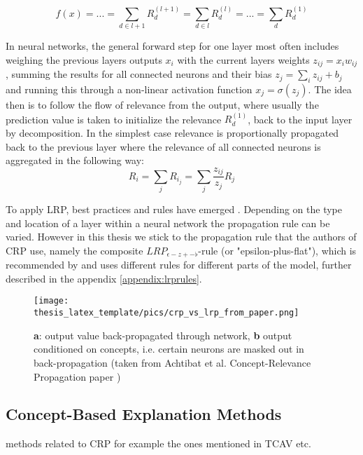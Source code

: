 \begin{equation}
    f(x) = ... = \sum_{d \in l+1} R^{(l+1)}_d =  \sum_{d \in l} R^{(l)}_d = ... =  \sum_{d} R^{(1)}_d
\end{equation}

In neural networks, the general forward step for one layer most often includes weighing the previous layers outputs $x_i$ with the current layers weights $z_{ij} = x_i w_{ij}$, summing the results for all connected neurons and their bias $z_{j} = \sum_{i} z_{ij} + b_j$ and running this through a non-linear activation function $x_j = \sigma (z_j)$.
The idea then is to follow the flow of relevance from the output, where usually the prediction value is taken to initialize the relevance $R^(1)_d$, back to the input layer by decomposition. In the simplest case relevance is proportionally propagated back to the previous layer where the relevance of all connected neurons is aggregated in the following way:
\begin{equation}
    R_i = \sum_{j}  R_{i_j} = \sum_{j} \frac{z_{ij}}{z_j} R_j
\end{equation}

To apply LRP, best practices and rules have emerged \cite{Kohlbrenner2020, Montavon2019, Samek2021}. Depending on the type and location of a layer within a neural network the propagation rule can be varied. However in this thesis we stick to the propagation rule that the authors of CRP use, namely the composite $LRP_{\epsilon-z+-\flat}$-rule (or "epsilon-plus-flat"), which is recommended by \cite{Kohlbrenner2020} and uses different rules for different parts of the model, further described in the appendix \autoref{appendix:lrprules}.

\begin{figure}
    \centering
    \texttt{[image: thesis\_latex\_template/pics/crp\_vs\_lrp\_from\_paper.png]}
    \caption[CRP vs. LRP]{\textbf{a}: output value back-propagated through network, \textbf{b} output conditioned on concepts, i.e. certain neurons are masked out in back-propagation (taken from Achtibat et al. Concept-Relevance Propagation paper \cite{Achtibat2023}) }
    \label{fig:crp_vs_lrp}
\end{figure}

\subsection{Concept-Based Explanation Methods}
methods related to CRP
for example the ones mentioned in TCAV etc. 

